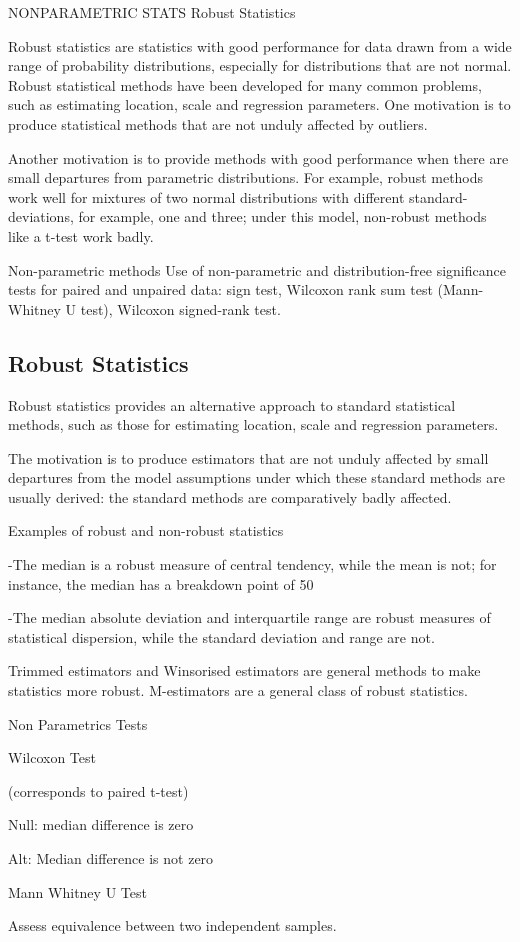 NONPARAMETRIC STATS
Robust Statistics

Robust statistics are statistics with good performance for data drawn from a wide range of probability distributions, especially for distributions that are not normal. Robust statistical methods have been developed for many common problems, such as estimating location, scale and regression parameters. One motivation is to produce statistical methods that are not unduly affected by outliers.

Another motivation is to provide methods with good performance when there are small departures from parametric distributions. For example, robust methods work well for mixtures of two normal distributions with different standard-deviations, for example, one and three; under this model, non-robust methods like a t-test work badly.

Non-parametric methods
Use of non-parametric and distribution-free significance tests for paired and unpaired data: sign test, Wilcoxon rank sum test (Mann-Whitney U test), Wilcoxon signed-rank test.


\subsection*{Robust Statistics}

Robust statistics provides an alternative approach to standard statistical methods, such as those for estimating location, scale and regression parameters. 


The motivation is to produce estimators that are not unduly affected by small departures from the model assumptions under which these standard methods are usually derived: the standard methods are comparatively badly affected.


Examples of robust and non-robust statistics

 -The median is a robust measure of central tendency, while the mean is not; for instance, the median has a breakdown point of 50%

 -The median absolute deviation and interquartile range are robust measures of statistical dispersion, while the standard deviation and range are not.


Trimmed estimators and Winsorised estimators are general methods to make statistics more robust. M-estimators are a general class of robust statistics.

Non Parametrics Tests


Wilcoxon Test 


(corresponds to paired t-test) 


Null: median difference is zero

Alt: Median difference is not zero


Mann Whitney U Test

Assess equivalence between two independent samples.

